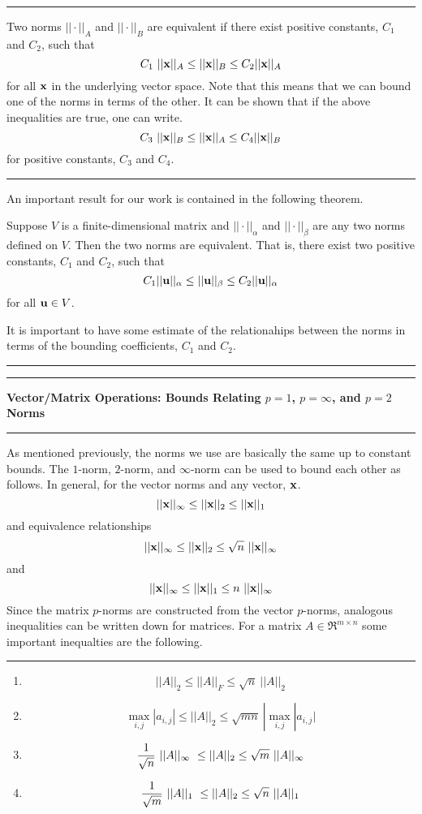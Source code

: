 \documentclass[10pt,fleqn]{article}
\begin{document}
\vskip0.1in\hrule\vskip0.1in
\begin{definition}
  Two norms $||\cdot||_A$ and $||\cdot||_B$ are equivalent if there exist
  positive constants, $C_1$ and $C_2$, such that
  $$
    C_1\ ||{\bf x}||_A \leq ||{\bf x}||_B \leq C_2 ||{\bf x}||_A
  $$
  for all ${\bf x}$ in the underlying vector space. Note that this means that we
  can bound one of the norms in terms of the other. It can be shown that if the
  above inequalities are true, one can write.
  $$
    C_3\ ||{\bf x}||_B \leq ||{\bf x}||_A \leq C_4 ||{\bf x}||_B
  $$
  for positive constants, $C_3$ and $C_4$.
\end{definition}
\vskip0.1in\hrule\vskip0.1in
\noindent
An important result for our work is contained in the following theorem.
\begin{theorem}
  Suppose $V$ is a finite-dimensional matrix and $||\cdot ||_\alpha$ and
  $||\cdot ||_\beta$ are any two norms defined on $V$. Then the two norms are
  equivalent. That is, there exist two positive constants, $C_1$ and $C_2$, such
  that
  $$
    C_1 ||{\bf u}||_\alpha \leq ||{\bf u}||_\beta \leq C_2 ||{\bf u}||_\alpha
  $$
  for all ${\bf u}\in V$.
\end{theorem}
It is important to have some estimate of the relationahips between the norms in
terms of the bounding coefficients, $C_1$ and $C_2$.
\vskip0.1in\hrule\vskip0.1in
\newpage
\vskip0.1in\hrule\vskip0.1in
\noindent
{\bf Vector/Matrix Operations: Bounds Relating $p=1$, $p=\infty$, and $p=2$
Norms}
\vskip0.1in\hrule\vskip0.1in
As mentioned previously, the norms we use are basically the same up to constant
bounds. The $1$-norm, $2$-norm, and $\infty$-norm can be used to bound each
other as follows. In general, for the vector norms and any vector, ${\bf x}$.
$$
  || {\bf x} ||_\infty \leq || {\bf x} ||_2 \leq || {\bf x} ||_1
$$
and equivalence relationships
$$
  || {\bf x} ||_\infty \leq || {\bf x} ||_2 \leq \sqrt{n}\ || {\bf x} ||_\infty
$$
and
$$
  || {\bf x} ||_\infty \leq || {\bf x} ||_1 \leq n\ || {\bf x} ||_\infty
$$
Since the matrix $p$-norms are constructed from the vector $p$-norms, analogous
inequalities can be written down for matrices. For a matrix
$A\in\Re^{m\times n}$ some important inequalties are the following.
\vskip0.1in\hrule\vskip0.1in
\begin{enumerate}
  \item
    $$
      || A ||_2 \leq || A ||_F \leq \sqrt{n}\ || A ||_2
    $$
  \item
    $$
      \max_{i,j} | a_{i,j} | \leq || A ||_2
                         \leq \sqrt{mn}\ | \max_{i,j} | a_{i,j} |
    $$
  \item
    $$
      {1\over{\sqrt{n}}}\ || A ||_\infty\ \leq || A ||_2
                              \leq \sqrt{m}\ || A ||_\infty
    $$
  \item
    $$
      {1\over{\sqrt{m}}}\ || A ||_1\ \leq || A ||_2
                              \leq \sqrt{n}\ || A ||_1
    $$
\end{enumerate}
\end{document}
